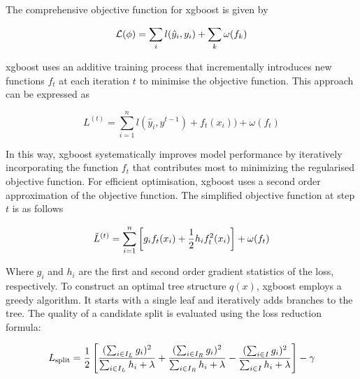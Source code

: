 \noindent
The comprehensive objective function for \gls{xgboost} is given by

\begin{equation}
    \centering
    \mathcal{L}(\phi) = \sum_i l(\hat{y}_i, y_i) + \sum_k \omega(f_k)
    \label{eq:xgboost_obj_function}
\end{equation}

\noindent
\gls{xgboost} uses an additive training process that incrementally introduces new functions $f_t$ at each iteration $t$ to minimise the objective function. This approach can be expressed as

\begin{equation}
    L^{(t)} = \sum_{i=1}^n l(\hat{y}_i, y^{t-1}) + f_t(x_i)) + \omega(f_t)
\end{equation}

\noindent
In this way, \gls{xgboost} systematically improves model performance by iteratively incorporating the function $f_t$ that contributes most to minimizing the regularised objective function.
\newline
\newline
For efficient optimisation, \gls{xgboost} uses a second order approximation of the objective function. The simplified objective function at step $t$ is as follows

\begin{equation}
    \centering
    \tilde{L}^{(t)} = \sum_{i=1}^n \left[ g_i f_t(x_i) + \frac{1}{2} h_i f_t^2(x_i) \right] + \omega(f_t) 
    \label{eq:simplified_obj_function}
\end{equation}

\noindent
Where $g_i$ and $h_i$ are the first and second order gradient statistics of the loss, respectively.
\newline
\newline
To construct an optimal tree structure $q(x)$, \gls{xgboost} employs a greedy algorithm. It starts with a single leaf and iteratively adds branches to the tree. The quality of a candidate split is evaluated using the loss reduction formula:

\begin{equation}
    \centering
    L_{\text{split}} = \frac{1}{2} \left[ \frac{(\sum_{i \in I_L} g_i)^2}{\sum_{i \in I_L} h_i + \lambda} + \frac{(\sum_{i \in I_R} g_i)^2}{\sum_{i \in I_R} h_i + \lambda} - \frac{(\sum_{i \in I} g_i)^2}{\sum_{i \in I} h_i + \lambda} \right] - \gamma
    \label{eq:loss_reduction_formula}
\end{equation}

